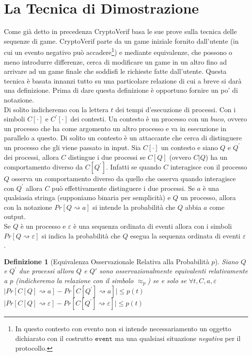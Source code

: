 \documentclass[a4paper,openright,twoside,12pt]{report}
\newtheorem{definizione}{Definizione}[chapter]
\begin{document}
\section{La Tecnica di Dimostrazione}
Come gi\`a detto in precedenza CryptoVerif basa le sue prove sulla tecnica delle sequenze di game.
CryptoVerif parte da un game iniziale fornito dall'utente 
(in cui un evento negativo pu\`o accadere\footnote{In questo contesto con evento non si intende necessariamento un oggetto 
dichiarato con il costrutto $\texttt{event}$ ma una qualsiasi situazione \emph{negativa} per il protocollo.}) e mediante equivalenze, 
che possono o meno
introdurre differenze, cerca di modificare un game in un altro fino ad arrivare ad un game finale che soddisfi le richieste fatte dall'utente. Questa tecnica \`e basata innanzi tutto su una 
particolare relazione di cui a breve si dar\`a una definizione. Prima di dare questa definizione \`e opportuno fornire un po' di notazione. \\Di solito indicheremo con la lettera $t$ dei tempi d'esecuzione di processi. Con i simboli $C[\cdot]$ e $C^{'}[\cdot]$ dei contesti.
Un contesto \`e un processo con un $buco$, ovvero un processo che ha come argomento un altro processo e va in esecuzione in parallelo a questo. Di solito un contesto \`e un attaccante che cerca di distinguere un processo che 
gli viene passato in input. Sia $C[\cdot]$ un contesto e siano $Q$ e $Q^{'}$ dei processi, allora $C$ distingue i due processi se $C[Q]$ (ovvero $C|Q$) ha un comportamento diverso da $C[Q^{'}]$.
Infatti se quando $C$ interagisce con il processo $Q$ osserva un comportamento diverso da quello che osserva quando interagisce con $Q^{'}$ allora $C$ pu\`o effettivamente distinguere i due processi.
Se $a$ \`e una qualsiasia stringa (supponiamo binaria per semplicit\`a) e $Q$ un processo, allora con la notazione $Pr[Q \rightsquigarrow a]$ si intende la probabilit\`a
che $Q$ abbia $a$ come output. \\
Se $Q$ \`e un processo e $\varepsilon$ \`e una sequenza ordinata di eventi allora con i simboli $Pr[Q \rightsquigarrow \varepsilon]$ si indica la probabilit\`a che $Q$ esegua la sequenza ordinata di eventi $\varepsilon$ . 
\begin{definizione}[Equivalenza Osservazionale Relativa alla Probabilit\`a $p$]
Siano $Q$ e $Q^{'}$ due processi allora $Q$ e $Q{'}$ sono osservazionalmente equivalenti relativamente a $p$ (indicheremo la relazione con il simbolo $\approx_p$) se e solo se $\forall t, C, a, \varepsilon$
$\lvert Pr[C[Q] \rightsquigarrow a] - Pr[C[Q^{'}]\rightsquigarrow a] \rvert \leq p(t)$ $\lvert Pr[C[Q] \rightsquigarrow \varepsilon] -  Pr[C[Q^{'}] \rightsquigarrow \varepsilon]\rvert \leq p(t)$ 
\end{definizione}
\end{document}
